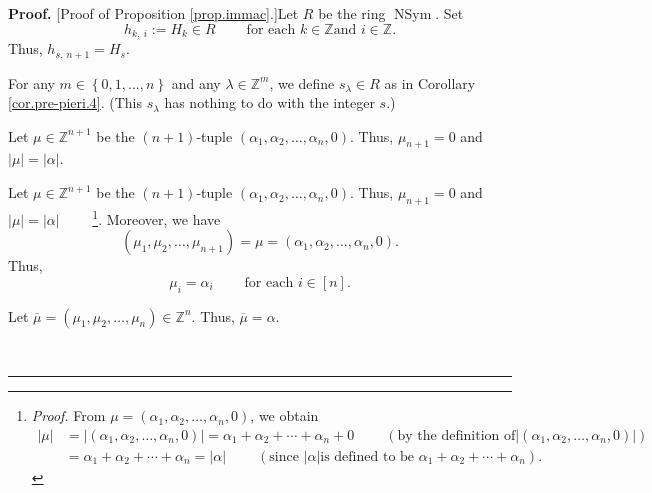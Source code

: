 \documentclass
[numbers=enddot,12pt,final,onecolumn,notitlepage,english]{scrartcl}%
\theoremstyle{definition}
\newenvironment{proof}[1][Proof]{\noindent\textbf{#1.} }{\ \rule{0.5em}{0.5em}}
\newenvironment{verlong}{}{}
\newenvironment{vershort}{}{}
\begin{document}
\begin{proof}
[Proof of Proposition \ref{prop.immac}.]Let $R$ be the ring
$\operatorname*{NSym}$. Set%
\[
h_{k,\ i}:=H_{k}\in R\ \ \ \ \ \ \ \ \ \ \text{for each }k\in\mathbb{Z}\text{
and }i\in\mathbb{Z}.
\]
Thus, $h_{s,\ n+1}=H_{s}$.

For any $m\in\left\{  0,1,\ldots,n\right\}  $ and any $\lambda\in
\mathbb{Z}^{m}$, we define $s_{\lambda}\in R$ as in Corollary
\ref{cor.pre-pieri.4}. (This $s_{\lambda}$ has nothing to do with the integer
$s$.)

\begin{vershort}
Let $\mu\in\mathbb{Z}^{n+1}$ be the $\left(  n+1\right)  $-tuple $\left(
\alpha_{1},\alpha_{2},\ldots,\alpha_{n},0\right)  $. Thus, $\mu_{n+1}=0$ and
$\left\vert \mu\right\vert =\left\vert \alpha\right\vert $.
\end{vershort}

\begin{verlong}
Let $\mu\in\mathbb{Z}^{n+1}$ be the $\left(  n+1\right)  $-tuple $\left(
\alpha_{1},\alpha_{2},\ldots,\alpha_{n},0\right)  $. Thus, $\mu_{n+1}=0$ and
$\left\vert \mu\right\vert =\left\vert \alpha\right\vert $%
\ \ \ \ \footnote{\textit{Proof.} From $\mu=\left(  \alpha_{1},\alpha
_{2},\ldots,\alpha_{n},0\right)  $, we obtain%
\begin{align*}
\left\vert \mu\right\vert  &  =\left\vert \left(  \alpha_{1},\alpha_{2}%
,\ldots,\alpha_{n},0\right)  \right\vert =\alpha_{1}+\alpha_{2}+\cdots
+\alpha_{n}+0\ \ \ \ \ \ \ \ \ \ \left(  \text{by the definition of
}\left\vert \left(  \alpha_{1},\alpha_{2},\ldots,\alpha_{n},0\right)
\right\vert \right) \\
&  =\alpha_{1}+\alpha_{2}+\cdots+\alpha_{n}=\left\vert \alpha\right\vert
\ \ \ \ \ \ \ \ \ \ \left(  \text{since }\left\vert \alpha\right\vert \text{
is defined to be }\alpha_{1}+\alpha_{2}+\cdots+\alpha_{n}\right)  .
\end{align*}
}. Moreover, we have%
\[
\left(  \mu_{1},\mu_{2},\ldots,\mu_{n+1}\right)  =\mu=\left(  \alpha
_{1},\alpha_{2},\ldots,\alpha_{n},0\right)  .
\]
Thus,%
\begin{equation}
\mu_{i}=\alpha_{i}\ \ \ \ \ \ \ \ \ \ \text{for each }i\in\left[  n\right]  .
\label{pf.prop.immac.mui=}%
\end{equation}

\end{verlong}

\begin{vershort}
Let $\overline{\mu}=\left(  \mu_{1},\mu_{2},\ldots,\mu_{n}\right)
\in\mathbb{Z}^{n}$. Thus, $\overline{\mu}=\alpha$.
\end{vershort}


\end{proof}
\end{document}
